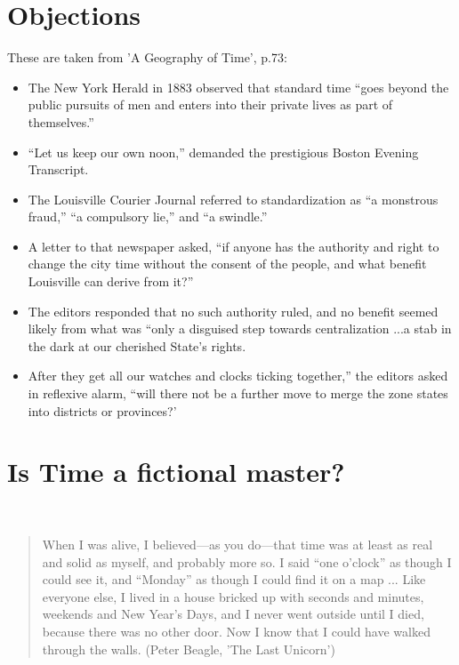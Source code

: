 \documentclass[11pt]{article}
\begin{document}
\newpage


\section*{Objections}
These are taken from 'A Geography of Time', p.73: 
\begin{itemize}
\item The New York Herald in 1883 observed that
standard time ``goes beyond the public pursuits of men and enters
into their private lives as part of themselves.''
\item ``Let us keep our own noon,'' demanded the prestigious Boston Evening Transcript. 
\item The Louisville Courier Journal referred to standardization as ``a monstrous fraud,'' ``a compulsory
lie,'' and ``a swindle.''
\item  A letter to that newspaper asked, ``if anyone has the authority
and right to change the city time without the consent of
the people, and what benefit Louisville can derive from it?''
\item The editors responded that no such authority ruled, and no
benefit seemed likely from what was ``only a disguised step
towards centralization ...a stab in the dark at our cherished
State's rights. 
\item After they get all our watches and clocks ticking
together,'' the editors asked in reflexive alarm, ``will
there not be a further move to merge the zone states into
districts or provinces?'
\end{itemize}

\newpage


\section*{Is Time a fictional master?}
\
\begin{quote}
When I was alive, I believed---as you do---that time was at
least as real and solid as myself, and probably more so. I said
``one o'clock'' as though I could see it, and ``Monday'' as though I could find it on a map ... Like everyone else, I
lived in a house bricked up with seconds and minutes, weekends
and New Year’s Days, and I never went outside until I
died, because there was no other door. Now I know that I
could have walked through the walls. (Peter Beagle, 'The Last Unicorn')
\end{quote}
\end{document}
